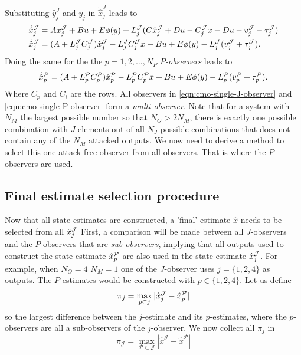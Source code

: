 Substituting $\hat{y}_j^J$ and $y_j$ in $\dot{\hat{x}}_j^J$ leads to
\begin{equation}\label{eqn:cmo-single-J-observer}
    \begin{split}
        \dot{\hat{x}}_j^{\mathcal{J}} &= Ax_j^{\mathcal{J}} + Bu + E\phi(y) + L_j^{\mathcal{J}}(C\hat{x}_j^{\mathcal{J}} + Du - C_j^{\mathcal{J}}x - Du - v_j^{\mathcal{J}} - \tau^{\mathcal{J}}_j) \\
        \dot{\hat{x}}_j^{\mathcal{J}} &= (A + L_j^{\mathcal{J}}C_j^{\mathcal{J}})\hat{x}^{\mathcal{J}}_j - L_j^JC_j^{\mathcal{J}}x + Bu + E\phi(y) - L_j^{\mathcal{J}}(v_j^{\mathcal{J}} + \tau_j^{\mathcal{J}}). \\
    \end{split}    
\end{equation}
Doing the same for the the $p=1,2,\dots,N_P$ $P$\textit{-observers} leads to
\begin{equation}\label{eqn:cmo-single-P-observer}
    \dot{\hat{x}}_p^{\mathcal{P}} = (A + L_p^{\mathcal{P}}C_p^{\mathcal{P}})\hat{x}_p^{\mathcal{P}} - L_p^{\mathcal{P}}C_p^{\mathcal{P}}x + Bu + E\phi(y) - L_p^{\mathcal{P}}(v_p^{\mathcal{P}} + \tau_p^{\mathcal{P}}).
\end{equation}
Where $C_p$ and $C_i$ are the rows. All observers in \eqref{eqn:cmo-single-J-observer} and \eqref{eqn:cmo-single-P-observer} form a \textit{multi-observer}. Note that for a system with $N_M$ the largest possible number so that $N_O > 2N_M$, there is exactly one possible combination with $J$ elements out of all $N_J$ possible combinations that does not contain any of the $N_M$ attacked outputs. We now need to derive a method to select this one attack free observer from all observers. That is where the $P$-observers are used.

\subsection{Final estimate selection procedure}
\label{subsec:estimate-selection}
Now that all state estimates are constructed, a 'final' estimate $\hat{x}$ needs to be selected from all $\hat{x}_j^{\mathcal{J}}$ First, a comparison will be made between all $J$-observers and the $P$-observers that are \textit{sub-observers}, implying that all outputs used to construct the state estimate $\hat{x}_p^{\mathcal{P}}$ are also used in the state estimate $\hat{x}_j^{\mathcal{J}}$. For example, when $N_O=4$ $N_M=1$ one of the $J$-observer uses $j=\{1,2,4\}$ as outputs. The $P$-estimates would be constructed with $p \in \{1,2,4\}$. Let us define 
\begin{equation*}
   \pi_{j} = \max_{p \subset j} |\hat{x}^{\mathcal{J}}_{j} - \hat{x}^{\mathcal{P}}_{p}|
\end{equation*}
so the largest difference between the $j$-estimate and its $p$-estimates, where the $p$-observers are all a sub-observers of the $j$-observer. We now collect all $\pi_j$ in
\begin{equation*}
   \pi_{\mathcal{J}} = \max_{\mathcal{P} \subset \mathcal{J}} |\hat{x}^{\mathcal{J}} - \hat{x}^{\mathcal{P}}|
\end{equation*}

